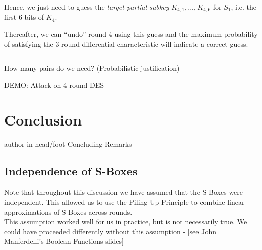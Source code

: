 \documentclass[9pt]{beamer}
\begin{document}
\begin{frame}
\begin{columns}
\begin{column}{0.6\textwidth}
\vspace{2mm}
\pause Hence, we just need to guess the {\it target partial subkey} $K_{4,1}, ..., K_{4,6}$ for $S_1$, i.e. the first 6 bits of $K_4$. 

\vspace{2mm}
\pause Thereafter, we can ``undo'' round 4 using this guess and  the maximum probability of satisfying the 3 round differential characteristic will indicate a correct guess.
\end{column}
\end{columns}
\end{frame}

\begin{frame}
How many pairs do we need? (Probabilistic justification)

\end{frame}

\begin{frame}
DEMO: Attack on 4-round DES
\end{frame}


\section{Conclusion}
\begin{frame}
\begin{beamercolorbox}[ht=2.5ex,dp=1.125ex,center,rounded=true,shadow=true]{author in head/foot}
Concluding Remarks
\end{beamercolorbox}
\end{frame}

\subsection{Independence of S-Boxes}
\begin{frame}
Note that throughout this discussion we have assumed that the S-Boxes were independent. This allowed us to use the Piling Up Principle to combine linear approximations of S-Boxes across rounds. \\
\vspace{3mm}
This assumption worked well for us in practice, but is not necessarily true. We could have proceeded differently without this assumption - [see John Manferdelli's Boolean Functions slides]
\end{frame}
\end{document}

